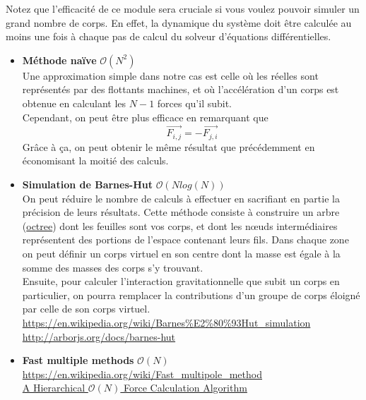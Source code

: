 \documentclass{article}
\begin{document}
Notez que l'efficacité de ce module sera cruciale si vous voulez pouvoir simuler un grand nombre de corps. En effet, la dynamique du système doit être calculée au moins une fois à chaque pas de calcul du solveur d'équations différentielles.

\begin{itemize}
    \item \textbf{Méthode naïve} $\mathcal{O}(N^2)$ \\
    Une approximation simple dans notre cas est celle où les réelles sont représentés par des flottants machines, et où l'accélération d'un corps est obtenue en calculant les $N-1$ forces qu'il subit.\\
    Cependant, on peut être plus efficace en remarquant que
    \begin{equation*}
    \overrightarrow{F_{i,j}} = - \overrightarrow{F_{j,i}}
    \end{equation*}
    Grâce à ça, on peut obtenir le même résultat que précédemment en économisant la moitié des calculs.
    \item \textbf{Simulation de Barnes-Hut} $\mathcal{O}(N log(N))$ \\
    On peut réduire le nombre de calculs à effectuer en sacrifiant en partie la précision de leurs résultats. Cette méthode consiste à construire un arbre (\href{https://en.wikipedia.org/wiki/Octree}{octree}) dont les feuilles sont vos corps, et dont les nœuds intermédiaires représentent des portions de l'espace contenant leurs fils. Dans chaque zone on peut définir un corps virtuel en son centre dont la masse est égale à la somme des masses des corps s'y trouvant. \\
    Ensuite, pour calculer l'interaction gravitationnelle que subit un corps en particulier, on pourra remplacer la contributions d'un groupe de corps éloigné par celle de son corps virtuel. \\
    \url{https://en.wikipedia.org/wiki/Barnes\%E2\%80\%93Hut_simulation}\\
    \url{http://arborjs.org/docs/barnes-hut}
    \item \textbf{Fast multiple methods} $\mathcal{O}(N)$ \\
    \url{https://en.wikipedia.org/wiki/Fast_multipole_method}\\
    \href{https://arxiv.org/pdf/astro-ph/0202512.pdf}{A Hierarchical $\mathcal{O}(N)$ Force Calculation Algorithm}
\end{itemize}

\vspace{1em}
\end{document}
